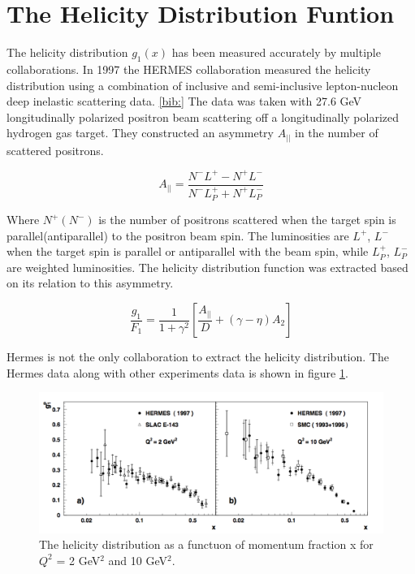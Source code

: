 \documentclass[abstract = on,listof=totoc, bibliography=totoc]{scrreprt}
\begin{document}
\section{The Helicity Distribution Funtion}

The helicity distribution $g_1(x)$ has been measured accurately by multiple collaborations. In 1997 the HERMES collaboration measured the helicity distribution using a combination of inclusive and semi-inclusive lepton-nucleon deep inelastic scattering data. \ref{bib:} The data was taken with 27.6 GeV longitudinally polarized positron beam scattering off a longitudinally polarized hydrogen gas target. They constructed an asymmetry $A_{||}$ in the number of scattered positrons. 

\begin{equation}
A_{||} = \frac{N^-L^+ - N^+L^-}{N^-L_P^+ + N^+L_P^-} 
\end{equation}

Where $N^+(N^-)$ is the number of positrons scattered when the target spin is parallel(antiparallel) to the positron beam spin. The luminosities are $L^+$, $L^-$ when the target spin is parallel or antiparallel with the beam spin, while $L^+_P$, $L^-_P$ are weighted luminosities. The helicity distribution function was extracted based on its relation to this asymmetry.

\begin{equation}
\frac{g_1}{F_1} = \frac{1}{1+\gamma^2}\left[\frac{A_{||}}{D} + (\gamma - \eta)A_2\right]
\end{equation}

   
Hermes is not the only collaboration to extract the helicity distribution. The Hermes data along with other experiments data is shown in figure \ref{fig:helicityDist}. 


 \begin{figure}
\begin{center}
\includegraphics[width = 1\textwidth]{helicityDistFromHermes}
\caption[HERMES results for helicity distribution function]{The helicity distribution as a functuon of momentum fraction x for $Q^2$ = 2 GeV$^2$ and 10 GeV$^2$.}
\label{fig:helicityDist}
\end{center}
\end{figure}
\end{document}
